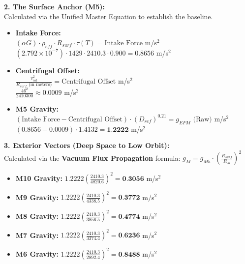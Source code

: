 \documentclass[11pt, a4paper]{article}
\begin{document}
  \vspace{1.0em}
  \noindent \textbf{2. The Surface Anchor (M5):} \\
  \hspace*{1em} Calculated via the Unified Master Equation to establish the baseline.
  \begin{itemize}
    \item \textbf{Intake Force:} \\[0.5em]
    \hspace*{2em} $(\alpha G) \cdot \rho_{eff} \cdot R_{surf} \cdot \tau(T) = \text{Intake Force}$ m/s$^2$ \\[1em]
    \hspace*{2em} $(2.792 \times 10^{-7}) \cdot 1429 \cdot 2410.3 \cdot 0.900 = 0.8656$ m/s$^2$
    
    \item \textbf{Centrifugal Offset:} \\[0.5em]
    \hspace*{2em} $\frac{v_{rot}^2}{R_{surf} \text{ (in meters)}} = \text{Centrifugal Offset}$ m/s$^2$ \\[1em]
    \hspace*{2em} $\frac{46^2}{2410300} \approx 0.0009$ m/s$^2$
    
    \item \textbf{M5 Gravity:} \\[0.5em]
    \hspace*{2em} $(\text{Intake Force} - \text{Centrifugal Offset}) \cdot (D_{ref})^{0.21} = g_{EFM} \text{ (Raw)}$ m/s$^2$ \\[1em]
    \hspace*{2em} $(0.8656 - 0.0009) \cdot 1.4132 = \textbf{1.2222}$ m/s$^2$
  \end{itemize}

  \clearpage
  \noindent \textbf{3. Exterior Vectors (Deep Space to Low Orbit):} \\
  \hspace*{1em} Calculated via the \textbf{Vacuum Flux Propagation} formula: $g_M = g_{M5} \cdot \left( \frac{R_{surf}}{R_M} \right)^2$
  \begin{itemize}
    \item \textbf{M10 Gravity:} $1.2222 \left( \frac{2410.3}{4820.6} \right)^2 = \textbf{0.3056}$ m/s$^2$
    \item \textbf{M9 Gravity:} $1.2222 \left( \frac{2410.3}{4338.5} \right)^2 = \textbf{0.3772}$ m/s$^2$
    \item \textbf{M8 Gravity:} $1.2222 \left( \frac{2410.3}{3856.5} \right)^2 = \textbf{0.4774}$ m/s$^2$
    \item \textbf{M7 Gravity:} $1.2222 \left( \frac{2410.3}{3374.4} \right)^2 = \textbf{0.6236}$ m/s$^2$
    \item \textbf{M6 Gravity:} $1.2222 \left( \frac{2410.3}{2892.4} \right)^2 = \textbf{0.8488}$ m/s$^2$
  \end{itemize}
\end{document}
